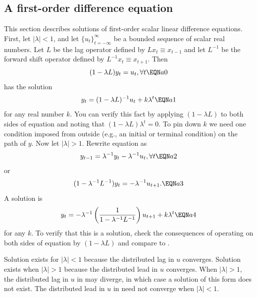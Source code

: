 \medskip
{}\label{appa1}%
\subsection{A first-order difference equation}
This section describes  solutions of 
first-order scalar linear difference equations.
First, let $ |\lambda | < 1$, and let $\{u_t\}_{t=-\infty}^\infty$ be a
bounded sequence  of scalar real numbers. Let $L$ be the
lag operator defined by $L x_t \equiv x_{t-1}$ and
let $L^{-1}$ be the forward shift operator defined by $L^{-1} x_t \equiv x_{t+1}$.
Then $$(1 - \lambda L) y_t = u_t, \forall t \EQN a0 $$
has the solution
$$y_t = (1 -\lambda L)^{-1} u_t +k \lambda^t \EQN a1$$ for
any real number $k$.  You can verify this fact by applying
$(1-\lambda L)$ to both sides  of equation  and noting
that $(1 - \lambda L) \lambda^t =0$.
To pin down $k$ we need one condition imposed from outside
(e.g., an initial or terminal condition)
on the path of $y$.
\medskip
Now let $| \lambda | > 1$.   Rewrite equation  as
$$ y_{t-1} = \lambda^{-1} y_t - \lambda^{-1} u_t , \forall t \EQN a2 $$
or
$$ (1 - \lambda^{-1} L^{-1}) y_t = - \lambda^{-1} u_{t+1}. \EQN a3 $$
A solution is
$$ y_t = - \lambda^{-1}\left({ 1 \over  1 - \lambda^{-1} L^{-1}} \right)
        u_{t+1} + k \lambda^t \EQN a4  $$
for any $k$.  To verify that  this is a solution,
check the consequences of operating on both sides of equation 
by $(1 -\lambda L)$ and compare to  .

\medskip
Solution  exists for $|\lambda  | < 1$ because the
distributed lag in $u$ converges.  Solution    exists
when $|\lambda| > 1$ because the distributed lead in $u$ converges.
When $|\lambda | > 1$, the distributed lag in $u$ in  may
diverge, in which case  a solution of this form does not exist.
The distributed lead in $u$ in  need not converge
when $|\lambda| < 1$.


